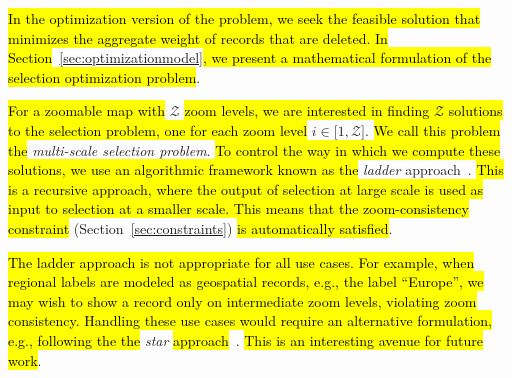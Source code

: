 \hl{In the optimization version of the problem, we seek the feasible solution that minimizes the aggregate weight of records that are deleted. In Section}~\ref{sec:optimizationmodel}\hl{, we present a mathematical formulation of the selection optimization problem}.

\hl{For a zoomable map with }$\mathcal{Z}$\hl{ zoom levels, we are interested in finding $\mathcal{Z}$ solutions to the selection problem, one for each zoom level }$i \in \lbrack 1, \mathcal{Z} \rbrack$. \hl{We call this problem the }\emph{multi-scale selection problem}. \hl{To control the way in which we compute these solutions, we use an algorithmic framework known as the }\emph{ladder} approach~\cite{foerster2010challenges}. \hl{This is a recursive approach, where the output of selection at large scale is used as input to selection at a smaller scale. This means that the zoom-consistency constraint }(Section~\ref{sec:constraints})\hl{ is automatically satisfied}.

\hl{The ladder approach is not appropriate for all use cases. For example, when regional labels are modeled as geospatial records, e.g., the label ``Europe'', we may wish to show a record only on intermediate zoom levels, violating zoom consistency. Handling these use cases would require an alternative formulation, e.g., following the the }\emph{star} \hl{approach}~\cite{foerster2010challenges}. \hl{This is an interesting avenue for future work}.  




